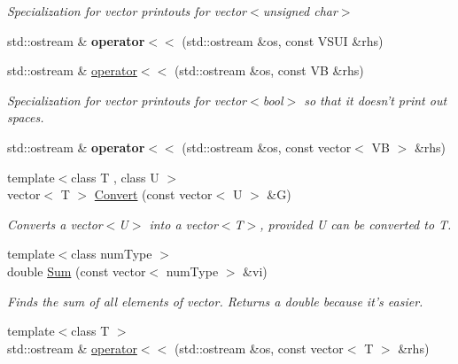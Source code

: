 \begin{DoxyCompactItemize}
\begin{DoxyCompactList}\small\item\em Specialization for vector printouts for vector$<$unsigned char$>$ \end{DoxyCompactList}\item 
\hypertarget{namespacedscr_a5dd272e8e0a4ee93b0f4fb211b36034d}{std\-::ostream \& {\bfseries operator$<$$<$} (std\-::ostream \&os, const V\-S\-U\-I \&rhs)}\label{namespacedscr_a5dd272e8e0a4ee93b0f4fb211b36034d}

\item 
\hypertarget{namespacedscr_a31efb135420477c4c6d5b0db36e5a5d0}{std\-::ostream \& \hyperlink{namespacedscr_a31efb135420477c4c6d5b0db36e5a5d0}{operator$<$$<$} (std\-::ostream \&os, const V\-B \&rhs)}\label{namespacedscr_a31efb135420477c4c6d5b0db36e5a5d0}

\begin{DoxyCompactList}\small\item\em Specialization for vector printouts for vector$<$bool$>$ so that it doesn't print out spaces. \end{DoxyCompactList}\item 
\hypertarget{namespacedscr_a74bea9e0175ad78b1cbb23f8eb906952}{std\-::ostream \& {\bfseries operator$<$$<$} (std\-::ostream \&os, const vector$<$ V\-B $>$ \&rhs)}\label{namespacedscr_a74bea9e0175ad78b1cbb23f8eb906952}

\item 
\hypertarget{namespacedscr_ae7c245645c0f7db8f3393723ac8c0d4a}{{\footnotesize template$<$class T , class U $>$ }\\vector$<$ T $>$ \hyperlink{namespacedscr_ae7c245645c0f7db8f3393723ac8c0d4a}{Convert} (const vector$<$ U $>$ \&G)}\label{namespacedscr_ae7c245645c0f7db8f3393723ac8c0d4a}

\begin{DoxyCompactList}\small\item\em Converts a vector$<$\-U$>$ into a vector$<$\-T$>$, provided U can be converted to T. \end{DoxyCompactList}\item 
\hypertarget{namespacedscr_a73d52e0a9c090503923b7269cdc80ce3}{{\footnotesize template$<$class num\-Type $>$ }\\double \hyperlink{namespacedscr_a73d52e0a9c090503923b7269cdc80ce3}{Sum} (const vector$<$ num\-Type $>$ \&vi)}\label{namespacedscr_a73d52e0a9c090503923b7269cdc80ce3}

\begin{DoxyCompactList}\small\item\em Finds the sum of all elements of vector. Returns a double because it's easier. \end{DoxyCompactList}\item 
\hypertarget{namespacedscr_aff6070464310e76893d1e8dd2113e2c6}{{\footnotesize template$<$class T $>$ }\\std\-::ostream \& \hyperlink{namespacedscr_aff6070464310e76893d1e8dd2113e2c6}{operator$<$$<$} (std\-::ostream \&os, const vector$<$ T $>$ \&rhs)}\label{namespacedscr_aff6070464310e76893d1e8dd2113e2c6}


\end{DoxyCompactItemize}
